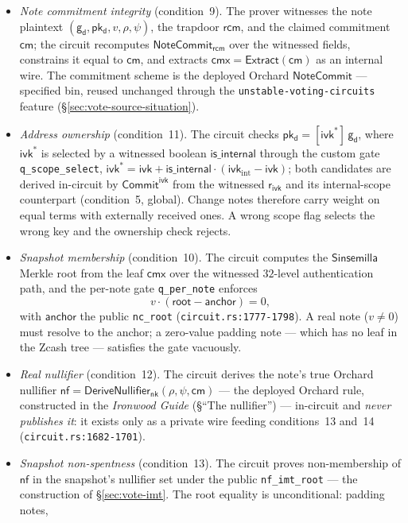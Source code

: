 \documentclass[11pt,a4paper]{article}
\theoremstyle{definition}
\newcommand{\nfsym}{\mathsf{nf}}
\newcommand{\cmsym}{\mathsf{cm}}
\newcommand{\cmx}{\mathsf{cmx}}
\newcommand{\NoteCommit}{\ensuremath{\mathsf{NoteCommit}}}
\newcommand{\Sinsemilla}{\ensuremath{\mathsf{Sinsemilla}}}
\newcommand{\CommitIvk}{\ensuremath{\mathsf{Commit}^{\mathsf{ivk}}}}
\newcommand{\Extract}{\ensuremath{\mathsf{Extract}}}
\newcommand{\nksym}{\ensuremath{\mathsf{nk}}}
\newcommand{\ivk}{\ensuremath{\mathsf{ivk}}}
\newcommand{\pkd}{\ensuremath{\mathsf{pk_d}}}
\newcommand{\gd}{\ensuremath{\mathsf{g_d}}}
\newcommand{\rcm}{\ensuremath{\mathsf{rcm}}}
\newcommand{\rivk}{\ensuremath{\mathsf{r_{ivk}}}}
\begin{document}
\begin{itemize}
\item \emph{Note commitment integrity} (condition~9). The prover witnesses
  the note plaintext $(\gd, \pkd, v, \rho, \psi)$, the trapdoor $\rcm$, and
  the claimed commitment $\cmsym$; the circuit recomputes
  $\NoteCommit_{\rcm}$ over the witnessed fields, constrains it equal to
  $\cmsym$, and extracts $\cmx = \Extract(\cmsym)$ as an internal wire. The
  commitment scheme is the deployed Orchard \NoteCommit{} --- specified
  bin, reused unchanged through the \texttt{unstable-voting-circuits}
  feature (\S\ref{sec:vote-source-situation}).
\item \emph{Address ownership} (condition~11). The circuit checks
  $\pkd = [\ivk^{*}]\,\gd$, where $\ivk^{*}$ is selected by a witnessed
  boolean $\mathsf{is\_internal}$ through the custom gate
  \texttt{q\_scope\_select},
  $\ivk^{*} = \ivk + \mathsf{is\_internal}\cdot(\ivk_{\mathrm{int}} - \ivk)$;
  both candidates are derived in-circuit by \CommitIvk{} from the witnessed
  $\rivk$ and its internal-scope counterpart (condition~5, global). Change
  notes therefore carry weight on equal terms with externally received
  ones. A wrong scope flag selects the wrong key and the ownership check
  rejects.
\item \emph{Snapshot membership} (condition~10). The circuit computes the
  \Sinsemilla{} Merkle root from the leaf $\cmx$ over the witnessed
  $32$-level authentication path, and the per-note gate
  \texttt{q\_per\_note} enforces
  \[
    v \cdot (\mathsf{root} - \mathsf{anchor}) = 0,
  \]
  with $\mathsf{anchor}$ the public \texttt{nc\_root}
  (\texttt{circuit.rs:1777-1798}). A real note ($v \neq 0$) must resolve to
  the anchor; a zero-value padding note --- which has no leaf in the Zcash
  tree --- satisfies the gate vacuously.
\item \emph{Real nullifier} (condition~12). The circuit derives the note's
  true Orchard nullifier
  $\nfsym = \mathsf{DeriveNullifier}_{\nksym}(\rho, \psi, \cmsym)$ --- the
  deployed Orchard rule, constructed in the \emph{Ironwood Guide}
  (\S``The nullifier'') --- in-circuit and
  \emph{never publishes it}: it exists only as a private wire feeding
  conditions~13 and~14 (\texttt{circuit.rs:1682-1701}).
\item \emph{Snapshot non-spentness} (condition~13). The circuit proves
  non-membership of $\nfsym$ in the snapshot's nullifier set under the
  public \texttt{nf\_imt\_root} --- the construction of
  \S\ref{sec:vote-imt}. The root equality is unconditional: padding notes,

\end{itemize}
\end{document}
